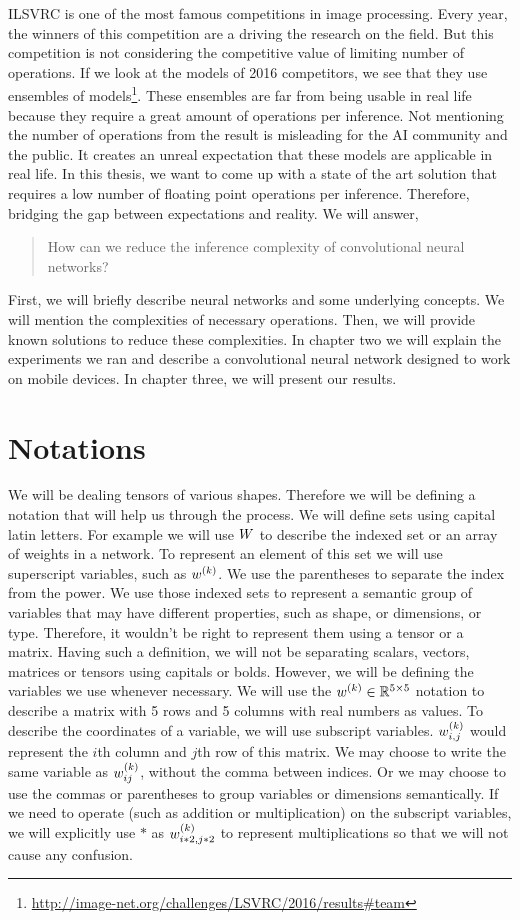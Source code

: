 ILSVRC is one of the most famous competitions in image processing. Every year, the winners of this competition are a driving the research on the field. But this competition is not considering the competitive value of limiting number of operations. If we look at the models of 2016 competitors, we see that they use ensembles of models\footnote{\url{http://image-net.org/challenges/LSVRC/2016/results\#team}}. These ensembles are far from being usable in real life because they require a great amount of operations per inference. Not mentioning the number of operations from the result is misleading for the AI community and the public. It creates an unreal expectation that these models are applicable in real life. In this thesis, we want to come up with a state of the art solution that requires a low number of floating point operations per inference. Therefore, bridging the gap between expectations and reality. We will answer,
\begin{quote}
How can we reduce the inference complexity of convolutional neural networks?
\end{quote}
First, we will briefly describe neural networks and some underlying concepts. We will mention the complexities of necessary operations. Then, we will provide known solutions to reduce these complexities. In chapter two we will explain the experiments we ran and describe a convolutional neural network designed to work on mobile devices. In chapter three, we will present our results. 


\section{Notations}
We will be dealing tensors of various shapes. Therefore we will be defining a notation that will help us through the process. We will define sets using capital latin letters. For example we will use $\all\weights$ to describe the indexed set or an array of weights in a network. To represent an element of this set we will use superscript variables, such as $w^{(k)}$. We use the parentheses to separate the index from the power. We use those indexed sets to represent a semantic group of variables that may have different properties, such as shape, or dimensions, or type. Therefore, it wouldn't be right to represent them using a tensor or a matrix. Having such a definition, we will not be separating scalars, vectors, matrices or tensors using capitals or bolds. However, we will be defining the variables we use whenever necessary. We will use the $w^{(k)} \in \mathbb{R}^{5 \times 5}$ notation to describe a matrix with 5 rows and 5 columns with real numbers as values. To describe the coordinates of a variable, we will use subscript variables. $w^{(k)}_{i,j}$ would represent the $i$th column and $j$th row of this matrix. We may choose to write the same variable as $w^{(k)}_{ij}$, without the comma between indices. Or we may choose to use the commas or parentheses to group variables or dimensions semantically. If we need to operate (such as addition or multiplication) on the subscript variables, we will explicitly use $*$ as $w^{(k)}_{i*2, j*2}$ to represent multiplications so that we will not cause any confusion. 

